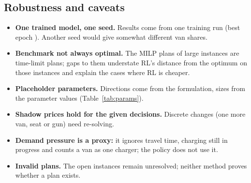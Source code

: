 \subsection{Robustness and caveats}
\begin{itemize}
  \item \textbf{One trained model, one seed.} Results come from one training run (best epoch \BestEpoch). Another seed would give somewhat different van shares.
  \item \textbf{Benchmark not always optimal.} The MILP plans of large instances are time-limit plans; gaps to them understate RL's distance from the optimum on those instances and explain the cases where RL is cheaper.
  \item \textbf{Placeholder parameters.} Directions come from the formulation, sizes from the parameter values (Table~\ref{tab:params}).
  \item \textbf{Shadow prices hold for the given decisions.} Discrete changes (one more van, seat or gun) need re-solving.
  \item \textbf{Demand pressure is a proxy:} it ignores travel time, charging still in progress and counts a van as one charger; the policy does not use it.
  \item \textbf{Invalid plans.} The \InvalidNoPlan{} open instances remain unresolved; neither method proves whether a plan exists.
\end{itemize}

